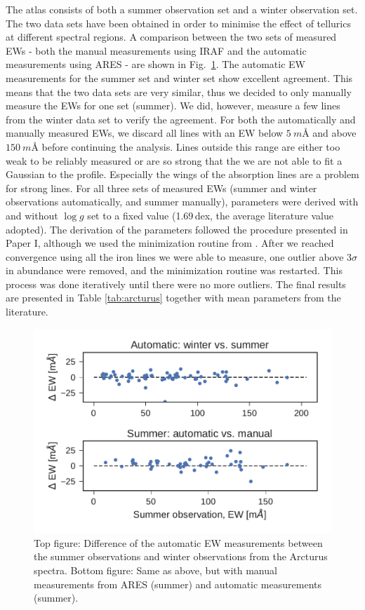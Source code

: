 \documentclass{aa}
\begin{document}
The atlas consists of both a summer observation set and a winter observation
set. The two data sets have been obtained in order to minimise the effect of
tellurics at different spectral regions. A comparison between the two sets of
measured EWs - both the manual measurements using IRAF and the automatic
measurements using ARES - are shown in Fig.~\ref{fig:EWcomp}. The automatic EW
measurements for the summer set and winter set show excellent agreement. This
means that the two data sets are very similar, thus we decided to only manually
measure the EWs for one set (summer). We did, however, measure a few lines from
the winter data set to verify the agreement. For both the automatically and
manually measured EWs, we discard all lines with an EW below $\SI{5}{m}$\AA{}
and above $\SI{150}{m}$\AA{} before continuing the analysis. Lines outside this
range are either too weak to be reliably measured or are so strong that the we
are not able to fit a Gaussian to the profile. Especially the wings of the
absorption lines are a problem for strong lines. For all three sets of measured
EWs (summer and winter observations automatically, and summer manually),
parameters were derived with and without $\log g$ set to a fixed value
(1.69\,dex, the average literature value adopted). The derivation of the
parameters followed the procedure presented in Paper I, although we used the
minimization routine from \citet{Andreasen2017a}. After we reached convergence
using all the iron lines we were able to measure, one outlier above $3\sigma$ in
abundance were removed, and the minimization routine was restarted. This process
was done iteratively until there were no more outliers. The final results are
presented in Table \ref{tab:arcturus} together with mean parameters from the
literature.


\begin{figure}[htpb!]
    \centering
    \includegraphics[width=1.0\linewidth]{figures/EWcomp.pdf}
    \caption{Top figure: Difference of the automatic EW measurements between the
             summer observations and winter observations from the Arcturus
             spectra. Bottom figure: Same as above, but with manual measurements
             from ARES (summer) and automatic measurements (summer).}
    \label{fig:EWcomp}
\end{figure}
\end{document}
